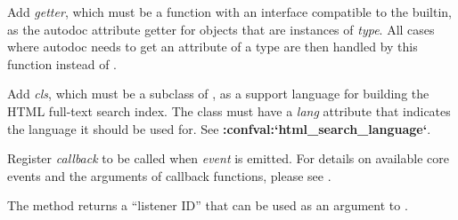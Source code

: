 \documentclass[letterpaper,10pt,english]{sphinxmanual}
\begin{document}

\begin{fulllineitems}
\label{ext/appapi:sphinx.application.Sphinx.add_autodoc_attrgetter}
Add \emph{getter}, which must be a function with an interface compatible to the
 builtin, as the autodoc attribute getter for objects that are
instances of \emph{type}.  All cases where autodoc needs to get an attribute of a
type are then handled by this function instead of .


\end{fulllineitems}


\begin{fulllineitems}
\label{ext/appapi:sphinx.application.Sphinx.add_search_language}
Add \emph{cls}, which must be a subclass of ,
as a support language for building the HTML full-text search index.  The
class must have a \emph{lang} attribute that indicates the language it should be
used for.  See {\color{red}\bfseries{}:confval:{}`html\_search\_language{}`}.


\end{fulllineitems}


\begin{fulllineitems}
\label{ext/appapi:sphinx.application.Sphinx.connect}
Register \emph{callback} to be called when \emph{event} is emitted.  For details on
available core events and the arguments of callback functions, please see
{\hyperref[ext/appapi:events]{}}.

The method returns a ``listener ID'' that can be used as an argument to
{\hyperref[ext/appapi:sphinx.application.Sphinx.disconnect]{}}.

\end{fulllineitems}
\end{document}
